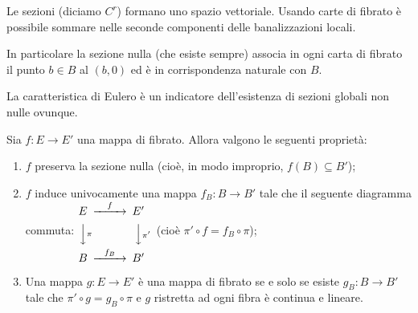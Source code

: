 \begin{remark}
	Le sezioni (diciamo $C^r$) formano uno spazio vettoriale. Usando carte di fibrato è possibile sommare nelle seconde componenti delle banalizzazioni locali.
	
	In particolare la sezione nulla (che esiste sempre) associa in ogni carta di fibrato il punto $b\in B$ al $(b,0)$ ed è in corrispondenza naturale con $B$.
	
	La caratteristica di Eulero è un indicatore dell'esistenza di sezioni globali non nulle ovunque.
\end{remark}

\begin{proposition}
	Sia $f:E \to E'$ una mappa di fibrato. Allora valgono le seguenti proprietà:
	\begin{enumerate}
	 \item $f$ preserva la sezione nulla (cioè, in modo improprio, $f(B)\subseteq B'$);
	 \item $f$ induce univocamente una mappa $f_B:B \to B'$ tale che il seguente diagramma commuta: 
	 $\begin{CD}
	 	E	@>f>>	E' \\
	 	@VV\pi V	@VV\pi' V \\
	 	B	@> f_B >> B'
	 \end{CD}\ \ $ %
	 (cioè $\pi'\circ f = f_B \circ \pi$);
	 \item Una mappa $g: E \to E'$ è una mappa di fibrato se e solo se esiste $g_B:B \to B'$ tale che $\pi'\circ g = g_B\circ \pi$ e $g$ ristretta ad ogni fibra è continua e lineare.
	\end{enumerate}

\end{proposition}



